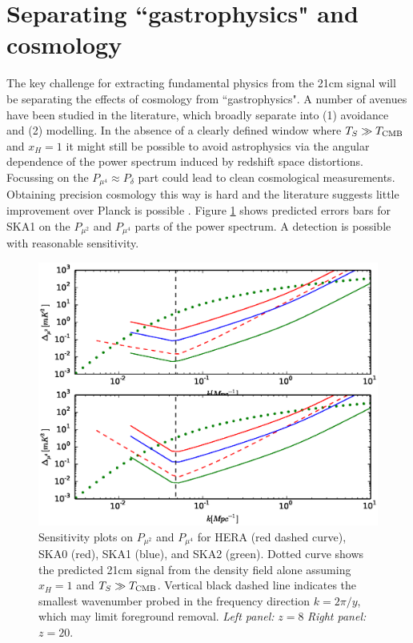 \documentclass{PoS}
\begin{document}
\section{Separating ``gastrophysics" and cosmology}
\label{sec:separation}

The key challenge for extracting fundamental physics from the 21cm signal will be separating the effects of cosmology from ``gastrophysics". A number of avenues have been studied in the literature, which broadly separate into (1) avoidance and (2) modelling. In the absence of a clearly defined window where $T_S\gg T_{\rm CMB}$ and $x_H=1$ it might still be possible to avoid astrophysics via the angular dependence of the power spectrum induced by redshift space distortions. Focussing on the $P_{\mu^4}\approx P_\delta$ part could lead to clean cosmological measurements. Obtaining precision cosmology this way is hard and the literature suggests little improvement over Planck is possible \cite{2006ApJ...653..815M,2008PhRvD..78b3529M}. Figure \ref{fig:musensitivity} shows predicted errors bars for SKA1 on the $P_{\mu^2}$ and $P_{\mu^4}$ parts of the power spectrum. A detection is possible with reasonable sensitivity.

\begin{figure}[htbp]
\begin{center}
\includegraphics[scale=0.35]{figures/musensitivityPlot_z8.eps}
\caption{Sensitivity plots on $P_{\mu^2}$ and $P_{\mu^4}$ for HERA (red dashed curve), SKA0 (red), SKA1 (blue), and SKA2 (green). Dotted curve shows the predicted 21cm signal from the density field alone assuming $x_H=1$ and $T_S\gg T_{\rm CMB}$. Vertical black dashed line indicates the smallest wavenumber probed in the frequency direction $k=2\pi/y$, which may limit foreground removal.  {\em Left panel:} $z=8$ {\em Right panel:} $z=20$.}
\label{fig:musensitivity}
\end{center}
\end{figure}
\end{document}
